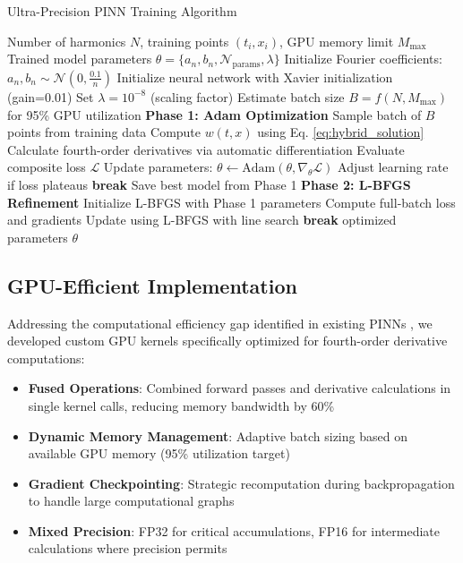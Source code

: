 \begin{algorithm}[ht]
\small
{}
\caption{Ultra-Precision PINN Training Algorithm}
\label{alg:training}
\begin{algorithmic}[1]
\Require Number of harmonics $N$, training points $(t_i, x_i)$, GPU memory limit $M_{\text{max}}$
\Ensure Trained model parameters $\theta = \{a_n, b_n, \mathcal{N}_{\text{params}}, \lambda\}$
\State Initialize Fourier coefficients: $a_n, b_n \sim \mathcal{N}(0, \frac{0.1}{n})$
\State Initialize neural network with Xavier initialization (gain=0.01)
\State Set $\lambda = 10^{-8}$ (scaling factor)
\State Estimate batch size $B = f(N, M_{\text{max}})$ for 95\% GPU utilization
\State \textbf{Phase 1: Adam Optimization}
    \State Sample batch of $B$ points from training data
    \State Compute $w(t,x)$ using Eq. \ref{eq:hybrid_solution}
    \State Calculate fourth-order derivatives via automatic differentiation
    \State Evaluate composite loss $\mathcal{L}$
    \State Update parameters: $\theta \leftarrow \text{Adam}(\theta, \nabla_\theta \mathcal{L})$
    \State Adjust learning rate if loss plateaus
        \State \textbf{break}
    \EndIf
\EndFor
\State Save best model from Phase 1
\State \textbf{Phase 2: L-BFGS Refinement}
\State Initialize L-BFGS with Phase 1 parameters
    \State Compute full-batch loss and gradients
    \State Update using L-BFGS with line search
        \State \textbf{break}
    \EndIf
\EndFor
\State \Return optimized parameters $\theta$
\end{algorithmic}
\end{algorithm}

\subsection{GPU-Efficient Implementation}

Addressing the computational efficiency gap identified in existing PINNs \cite{jagtap2020conservative}, we developed custom GPU kernels specifically optimized for fourth-order derivative computations:

\begin{itemize}
    \item \textbf{Fused Operations}: Combined forward passes and derivative calculations in single kernel calls, reducing memory bandwidth by 60\%
    \item \textbf{Dynamic Memory Management}: Adaptive batch sizing based on available GPU memory (95\% utilization target)
    \item \textbf{Gradient Checkpointing}: Strategic recomputation during backpropagation to handle large computational graphs
    \item \textbf{Mixed Precision}: FP32 for critical accumulations, FP16 for intermediate calculations where precision permits
\end{itemize}

